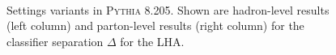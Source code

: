 \documentclass[11pt]{cernrep}
\begin{document}
\begin{figure}
\centering
{}
$\qquad$
\caption{Settings variants in \textsc{Pythia 8.205}.  Shown are hadron-level results (left column) and parton-level results (right column) for the classifier separation $\Delta$ for the LHA.}
\label{quarkgluon_fig:settings_variation_pythia}
\end{figure}
\end{document}
